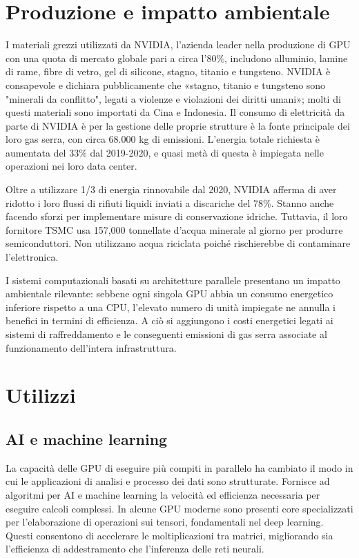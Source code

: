 \documentclass[12pt,a4paper,oneside]{book}
\begin{document}
\section{Produzione e impatto ambientale}

I materiali grezzi utilizzati da NVIDIA, l'azienda leader nella produzione di GPU con una quota di mercato globale pari a circa l’80\%, includono alluminio, lamine di rame, fibre di vetro, gel di silicone, stagno, titanio e tungsteno. NVIDIA è consapevole e dichiara pubblicamente che «stagno, titanio e tungsteno sono "minerali da conflitto"\citep[p.12]{nvidia2021report}, legati a violenze e violazioni dei diritti umani»; molti di questi materiali sono importati da Cina e Indonesia.
Il consumo di elettricità da parte di NVIDIA è per la gestione delle proprie strutture è la fonte principale dei loro gas serra, con circa 68.000 kg di emissioni. L'energia totale richiesta è aumentata del 33\% dal 2019-2020, e quasi metà di questa è impiegata nelle operazioni nei loro data center.

Oltre a utilizzare 1/3 di energia rinnovabile dal 2020, NVIDIA afferma di aver ridotto i loro flussi di rifiuti liquidi inviati a discariche del 78\%. Stanno anche facendo sforzi per implementare misure di conservazione idriche. Tuttavia, il loro fornitore TSMC usa 157,000 tonnellate d'acqua minerale al giorno per produrre semiconduttori. Non utilizzano acqua riciclata poiché rischierebbe di contaminare l'elettronica.

I sistemi computazionali basati su architetture parallele presentano un impatto ambientale rilevante: sebbene ogni singola GPU abbia un consumo energetico inferiore rispetto a una CPU, l’elevato numero di unità impiegate ne annulla i benefici in termini di efficienza. A ciò si aggiungono i costi energetici legati ai sistemi di raffreddamento e le conseguenti emissioni di gas serra associate al funzionamento dell’intera infrastruttura.

\section{Utilizzi}

\subsection{AI e machine learning}

La capacità delle GPU di eseguire più compiti in parallelo ha cambiato il modo in cui le applicazioni di analisi e processo dei dati sono strutturate. Fornisce ad algoritmi per AI e machine learning la velocità ed efficienza necessaria per eseguire calcoli complessi.
In alcune GPU moderne sono presenti core specializzati per l'elaborazione di operazioni sui tensori, fondamentali nel deep learning. Questi consentono di accelerare le moltiplicazioni tra matrici, migliorando sia l'efficienza di addestramento che l'inferenza delle reti neurali.
\end{document}

